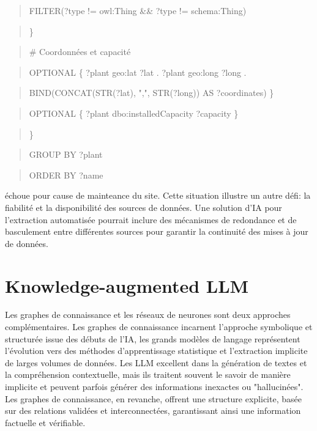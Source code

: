 \documentclass[a4paper,11pt]{report}
\begin{document}
\begin{quote}
FILTER(?type != owl:Thing \&\& ?type != schema:Thing)
\end{quote}

\begin{quote}
\}
\end{quote}

\begin{quote}
\end{quote}

\begin{quote}
\# Coordonnées et capacité
\end{quote}

\begin{quote}
OPTIONAL \{ ?plant geo:lat ?lat . ?plant geo:long ?long .
\end{quote}

\begin{quote}
BIND(CONCAT(STR(?lat), ",", STR(?long)) AS ?coordinates) \}
\end{quote}

\begin{quote}
OPTIONAL \{ ?plant dbo:installedCapacity ?capacity \}
\end{quote}

\begin{quote}
\}
\end{quote}

\begin{quote}
GROUP BY ?plant
\end{quote}

\begin{quote}
ORDER BY ?name
\end{quote}

échoue pour cause de mainteance du site. Cette situation illustre un autre défi: la fiabilité et la disponibilité des sources de données. Une solution d'IA pour l'extraction automatisée pourrait inclure des mécanismes de redondance et de basculement entre différentes sources pour garantir la continuité des mises à jour de données.

\section{Knowledge-augmented LLM}\label{knowledge-augmented-llm}

Les graphes de connaissance et les réseaux de neurones sont deux approches complémentaires. Les graphes de connaissance incarnent l'approche symbolique et structurée issue des débuts de l'IA, les grands modèles de langage représentent l'évolution vers des méthodes d'apprentissage statistique et l'extraction implicite de larges volumes de données. Les LLM excellent dans la génération de textes et la compréhension contextuelle, mais ils traitent souvent le savoir de manière implicite et peuvent parfois générer des informations inexactes ou "hallucinées". Les graphes de connaissance, en revanche, offrent une structure explicite, basée sur des relations validées et interconnectées, garantissant ainsi une information factuelle et vérifiable.
\end{document}
